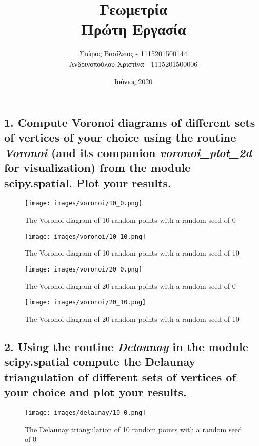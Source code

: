 \documentclass[12pt]{article}
\title{\hugeΥπολογιστική Γεωμετρία\\Πρώτη Εργασία}
\author{Σιώρος Βασίλειος - 1115201500144\\Ανδρινοπούλου Χριστίνα - 1115201500006}
\date{Ιούνιος 2020}
\newenvironment{matlab}
	{\begin{figure}[H]\centering\captionsetup{justification=centering}}
	{\end{figure}}
\begin{document}
\maketitle


\pagebreak


\subsection*{1. Compute Voronoi diagrams of different sets of vertices of your choice using
    the routine \textit{Voronoi} (and its companion \textit{voronoi\_plot\_2d} for visualization) from the module
    \textbf{scipy.spatial}. Plot your results.}

\begin{matlab}
    \texttt{[image: images/voronoi/10\_0.png]}
    \caption{The Voronoi diagram of 10 random points with a random seed of 0}
\end{matlab}

\begin{matlab}
    \texttt{[image: images/voronoi/10\_10.png]}
    \caption{The Voronoi diagram of 10 random points with a random seed of 10}
\end{matlab}

\begin{matlab}
    \texttt{[image: images/voronoi/20\_0.png]}
    \caption{The Voronoi diagram of 20 random points with a random seed of 0}
\end{matlab}

\begin{matlab}
    \texttt{[image: images/voronoi/20\_10.png]}
    \caption{The Voronoi diagram of 20 random points with a random seed of 10}
\end{matlab}

\pagebreak

\subsection*{2. Using the routine \textit{Delaunay} in the module \textbf{scipy.spatial} compute the Delaunay
    triangulation of different sets of vertices of your choice and plot your results.}

\begin{matlab}
    \texttt{[image: images/delaunay/10\_0.png]}
    \caption{The Delaunay triangulation of 10 random points with a random seed of 0}
\end{matlab}
\end{document}
